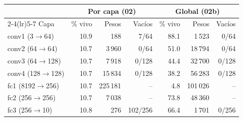 \begin{tabular}{@{}lrrrrrr@{}}\toprule
 & \multicolumn{3}{c}{Por capa (02)} & \multicolumn{3}{c}{Global (02b)} \\\cmidrule(lr){2-4}\cmidrule(lr){5-7}
Capa & \% vivo & Pesos & Vac\'ios & \% vivo & Pesos & Vac\'ios \\\midrule
conv1 (3$\to$64) & 10.9 & 188 & 7/64 & 88.1 & 1\,523 & 0/64 \\
conv2 (64$\to$64) & 10.7 & 3\,960 & 0/64 & 51.0 & 18\,794 & 0/64 \\
conv3 (64$\to$128) & 10.7 & 7\,918 & 0/128 & 44.4 & 32\,700 & 0/128 \\
conv4 (128$\to$128) & 10.7 & 15\,834 & 0/128 & 38.2 & 56\,283 & 0/128 \\
fc1 (8192$\to$256) & 10.7 & 225\,181 & -- & 4.8 & 101\,026 & -- \\
fc2 (256$\to$256) & 10.7 & 7\,038 & -- & 73.8 & 48\,360 & -- \\
fc3 (256$\to$10) & 10.8 & 276 & 102/256 & 66.4 & 1\,701 & 0/256 \\
\bottomrule\end{tabular}
